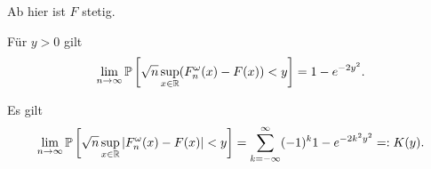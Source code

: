 Ab hier ist $F$ stetig.
\begin{thm}[Smirnow]
  Für $y > 0$ gilt
  \[\lim_{n \to \infty} \mathbb{P} \left[ \sqrt{n}
      \sup_{x \in \mathbb{R}} (F_n^\omega(x) - F(x)) < y \right]
    = 1 - e^{-2y^2}. \]
\end{thm}

\begin{thm}[Kolmogorow]
  Es gilt
  \[ \lim_{n \to \infty} \mathbb{P} \left[ \sqrt{n}
      \sup_{x \in \mathbb{R}} | F_n^\omega(x) - F(x) | < y \right]
    = \sum_{k = -\infty}^\infty (-1)^k 1 - e^{-2 k^2 y^2} =: K(y). \]
\end{thm}